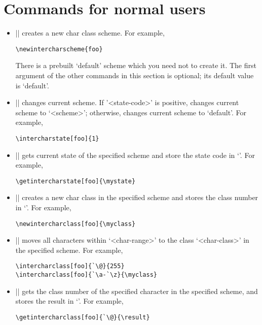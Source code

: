 \documentclass{article}
\begin{document}
\section{Commands for normal users}

\begin{itemize}
  \item || creates a new char class scheme. For example,
        \begin{verbatim}\newintercharscheme{foo}\end{verbatim}
        There is a prebuilt `default' scheme which you need not to create it.
        The first argument of the other commands in this section is optional;
        its default value is `default'.
  \item || changes current scheme.
        If '<state-code>' is positive, changes current scheme to `<scheme>';
        otherwise, changes current scheme to `default'. For example,
        \begin{verbatim}\intercharstate[foo]{1}\end{verbatim}
  \item |\getintercharstate[<scheme>]{\cs}| gets current state of the specified scheme
        and store the state code in `\cs'. For example,
        \begin{verbatim}\getintercharstate[foo]{\mystate}\end{verbatim}
  \item |\newintercharclass[<scheme>]{\cs}| creates a new char class in the specified scheme
        and stores the class number in `\cs'. For example,
        \begin{verbatim}\newintercharclass[foo]{\myclass}\end{verbatim}
  \item || moves all characters within
        `<char-range>' to the class `<char-class>' in the specified scheme. For example,
\begin{verbatim}
\intercharclass[foo]{`\@}{255}
\intercharclass[foo]{`\a-`\z}{\myclass}
\end{verbatim}  
  \item || gets the class number of the specified
        character in the specified scheme, and stores the result in `\cs'. For example,
        \begin{verbatim}\getintercharclass[foo]{`\@}{\result}\end{verbatim}

\end{itemize}
\end{document}
